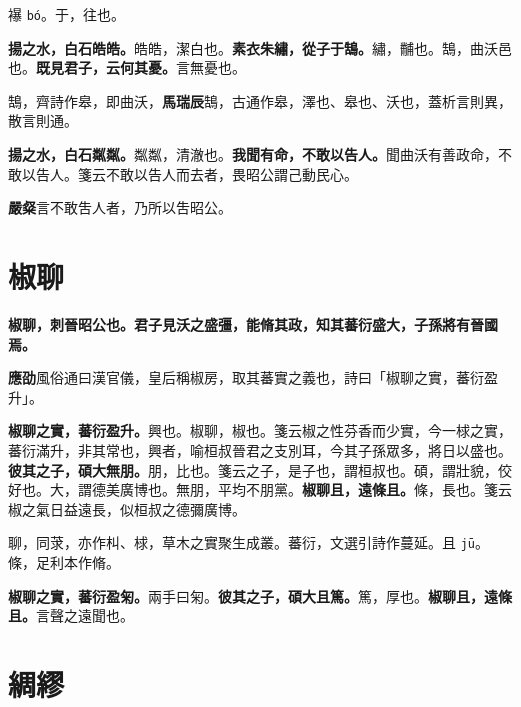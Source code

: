 \begin{quoting}襮 \texttt{bó}。于，往也。\end{quoting}

\textbf{揚之水，白石皓皓。}{\footnotesize 皓皓，潔白也。}\textbf{素衣朱繡，從子于鵠。}{\footnotesize 繡，黼也。鵠，曲沃邑也。}\textbf{既見君子，云何其憂。}{\footnotesize 言無憂也。}

\begin{quoting}鵠，齊詩作皋，即曲沃，\textbf{馬瑞辰}鵠，古通作皋，澤也、皋也、沃也，蓋析言則異，散言則通。\end{quoting}

\textbf{揚之水，白石粼粼。}{\footnotesize 粼粼，清澈也。}\textbf{我聞有命，不敢以告人。}{\footnotesize 聞曲沃有善政命，不敢以告人。箋云不敢以告人而去者，畏昭公謂己動民心。}

\begin{quoting}\textbf{嚴粲}言不敢吿人者，乃所以吿昭公。\end{quoting}

\section{椒聊}


\textbf{椒聊，刺晉昭公也。君子見沃之盛彊，能脩其政，知其蕃衍盛大，子孫將有晉國焉。}

\begin{quoting}\textbf{應劭}風俗通曰漢官儀，皇后稱椒房，取其蕃實之義也，詩曰「椒聊之實，蕃衍盈升」。\end{quoting}

\textbf{椒聊之實，蕃衍盈升。}{\footnotesize 興也。椒聊，椒也。箋云椒之性芬香而少實，今一梂之實，蕃衍滿升，非其常也，興者，喻桓叔晉君之支別耳，今其子孫眾多，將日以盛也。}\textbf{彼其之子，碩大無朋。}{\footnotesize 朋，比也。箋云之子，是子也，謂桓叔也。碩，謂壯貌，佼好也。大，謂德美廣博也。無朋，平均不朋黨。}\textbf{椒聊且，遠條且。}{\footnotesize 條，長也。箋云椒之氣日益遠長，似桓叔之德彌廣博。}

\begin{quoting}聊，同莍，亦作朻、梂，草木之實聚生成叢。蕃衍，文選引詩作蔓延。且 \texttt{jū}。條，足利本作脩。\end{quoting}

\textbf{椒聊之實，蕃衍盈匊。}{\footnotesize 兩手曰匊。}\textbf{彼其之子，碩大且篤。}{\footnotesize 篤，厚也。}\textbf{椒聊且，遠條且。}{\footnotesize 言聲之遠聞也。}

\section{綢繆}


